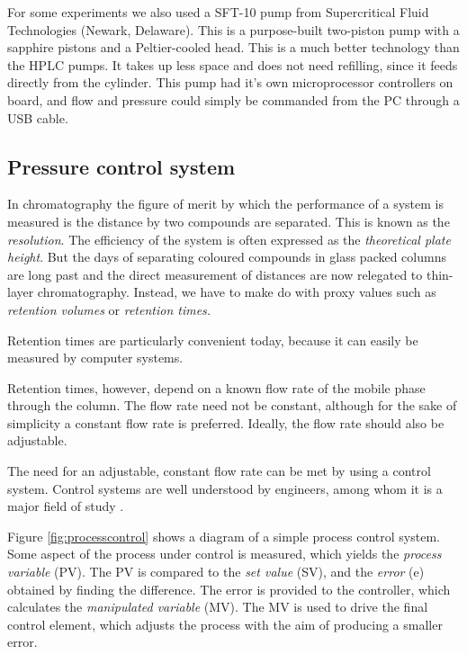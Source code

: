 For some experiments we also used a SFT-10 pump from Supercritical Fluid Technologies (Newark,
Delaware). This is a purpose-built two-piston pump with a sapphire pistons and a
Peltier-cooled head. This is a much better technology than the HPLC pumps. It
takes up less space and does not need refilling, since it feeds directly from
the cylinder. This pump had it's own microprocessor controllers on board,
and flow and pressure could simply be commanded from the PC through a USB cable. 



\subsection{Pressure control system}

In chromatography the figure of merit by which the performance of a system is
measured is the distance by two compounds are separated. This is known as the
\textit{resolution}. The efficiency of the system is often expressed as the
\textit{theoretical plate height}. But the days of separating coloured compounds
in glass packed columns are long past and the direct measurement of distances
are now relegated to thin-layer chromatography. Instead, we have to make do with
proxy values such as \textit{retention volumes} or \textit{retention times.}

Retention times are particularly convenient today, because it can easily be
measured by computer systems.

Retention times, however, depend on a known flow rate of the mobile phase
through the column. The flow rate need not be constant, although for the sake of
simplicity a constant flow rate is preferred. Ideally, the flow rate should also be
adjustable.

The need for an adjustable, constant flow rate can be met by using a control
system. Control systems are well understood by engineers, among whom it is a
major field of study \autocite{Koenig2009}. 

Figure \ref{fig:processcontrol} shows a diagram of a simple process control
system. Some aspect of the process under control is measured, which yields the
\textit{process variable} (PV). The PV is compared to the \textit{set value}
(SV), and the \textit{error} (e) obtained by finding the difference. The error
is provided to the controller, which calculates the \textit{manipulated
variable} (MV). The MV is used to drive the final control element, which adjusts
the process with the aim of producing a smaller error.

